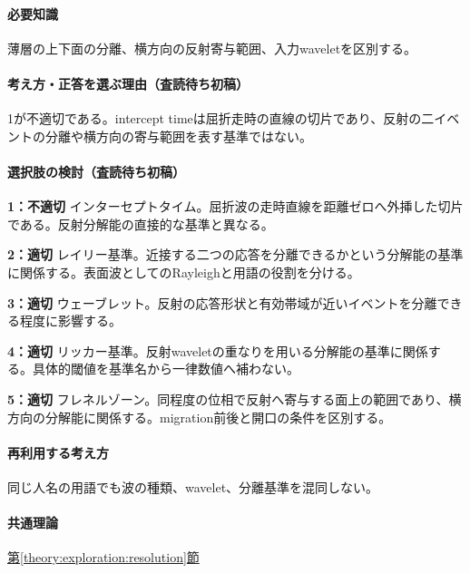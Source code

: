 \paragraph{必要知識} 薄層の上下面の分離、横方向の反射寄与範囲、入力waveletを区別する。

\paragraph{考え方・正答を選ぶ理由（査読待ち初稿）} 1が不適切である。intercept timeは屈折走時の直線の切片であり、反射の二イベントの分離や横方向の寄与範囲を表す基準ではない。

\paragraph{選択肢の検討（査読待ち初稿）}\mbox{}\par

\noindent\textbf{1：不適切} インターセプトタイム。屈折波の走時直線を距離ゼロへ外挿した切片である。反射分解能の直接的な基準と異なる。\par

\noindent\textbf{2：適切} レイリー基準。近接する二つの応答を分離できるかという分解能の基準に関係する。表面波としてのRayleighと用語の役割を分ける。\par

\noindent\textbf{3：適切} ウェーブレット。反射の応答形状と有効帯域が近いイベントを分離できる程度に影響する。\par

\noindent\textbf{4：適切} リッカー基準。反射waveletの重なりを用いる分解能の基準に関係する。具体的閾値を基準名から一律数値へ補わない。\par

\noindent\textbf{5：適切} フレネルゾーン。同程度の位相で反射へ寄与する面上の範囲であり、横方向の分解能に関係する。migration前後と開口の条件を区別する。\par

\paragraph{再利用する考え方} 同じ人名の用語でも波の種類、wavelet、分離基準を混同しない。

\paragraph{共通理論} \hyperref[theory:exploration:resolution]{第\ref*{theory:exploration:resolution}節}

